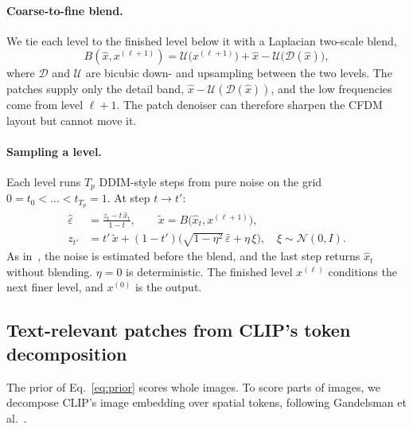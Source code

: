 \paragraph{Coarse-to-fine blend.}
We tie each level to the finished level below it with a Laplacian two-scale blend,
\begin{equation}
  B(\hat x, x^{(\ell+1)}) = \mathcal U\big(x^{(\ell+1)}\big) + \hat x - \mathcal U\big(\mathcal D(\hat x)\big),
  \label{eq:blend}
\end{equation}
where $\mathcal D$ and $\mathcal U$ are bicubic down- and upsampling between the two levels. The patches supply only the detail band, $\hat x-\mathcal U(\mathcal D(\hat x))$, and the low frequencies come from level $\ell+1$. The patch denoiser can therefore sharpen the CFDM layout but cannot move it.

\paragraph{Sampling a level.}
Each level runs $T_p$ DDIM-style steps from pure noise on the grid $0=t_0<\dots<t_{T_p}=1$. At step $t\to t'$:
\begin{align}
  \hat\varepsilon &= \frac{z_t - t\,\hat x_t}{1-t}, \qquad \tilde x = B\big(\hat x_t, x^{(\ell+1)}\big), \\
  z_{t'} &= t'\,\tilde x + (1-t')\Big(\sqrt{1-\eta^2}\,\hat\varepsilon + \eta\,\xi\Big),\quad \xi\sim\mathcal N(0,I).
\end{align}
As in~\cite{qiu2025efficient}, the noise is estimated before the blend, and the last step returns $\hat x_t$ without blending. $\eta=0$ is deterministic. The finished level $x^{(\ell)}$ conditions the next finer level, and $x^{(0)}$ is the output.

\subsection{Text-relevant patches from CLIP's token decomposition}
\label{sec:tokens}

The prior of Eq.~\eqref{eq:prior} scores whole images. To score parts of images, we decompose CLIP's image embedding over spatial tokens, following Gandelsman et al.~\cite{gandelsman2024interpreting}.

